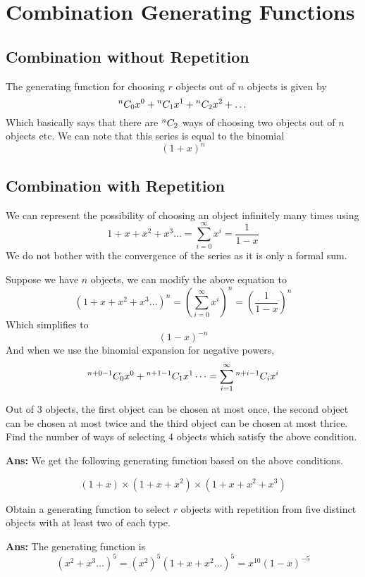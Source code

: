 \section{Combination Generating Functions}

\subsection{Combination without Repetition}

The generating function for choosing \mbox{$r$} objects out of \mbox{$n$} objects is given by
\[
    {}^{n}C_{0}x^0 + {}^{n}C_{1}x^1 + {}^{n}C_{2}x^2 + \dots
\]
Which basically says that there are \mbox{${}^{n}C_{2}$} ways of choosing two objects out of \mbox{$n$} objects etc.
We can note that this series is equal to the binomial
\[
    (1+x)^n
\]

\subsection{Combination with Repetition}
We can represent the possibility of choosing an object infinitely many times using
\[
    1+x+x^2+x^3\dots = \sum_{i=0}^{\infty} x^i = \frac{1}{1-x}
\]
We do not bother with the convergence of the series as it is only a formal sum.

Suppose we have \mbox{$n$} objects, we can modify the above equation to
\[
    (1+x+x^2+x^3\dots)^n = (\sum_{i=0}^{\infty} x^i)^n = \left(\frac{1}{1-x}\right)^n
\]
Which simplifies to
\[
    (1-x)^{-n}
\]
And when we use the binomial expansion for negative powers,
\[
    {}^{n+0-1}C_{0}x^0+{}^{n+1-1}C_{1}x^1\dots = \sum_{i=1}^{\infty}{}^{n+i-1}C_{i}x^i
\]
\begin{example}
    Out of 3 objects, the first object can be chosen at most once, the second object can be chosen at most twice and the third object can be chosen at most thrice. Find the number of ways of selecting 4 objects which satisfy the above condition.

    \textbf{Ans:} We get the following generating function based on the above conditions.

    \[
        (1+x) \times (1+x+x^2) \times (1+x+x^2+x^3)
    \]
\end{example}

\begin{example}
    Obtain a generating function to select \mbox{$r$} objects with repetition from five distinct objects with at least two of each type.

    \textbf{Ans:} The generating function is
    \[
        (x^2+x^3\dots)^5 = (x^2)^5 (1+x+x^2\dots)^5 = x^{10} (1-x)^{-5}
    \]
\end{example}

